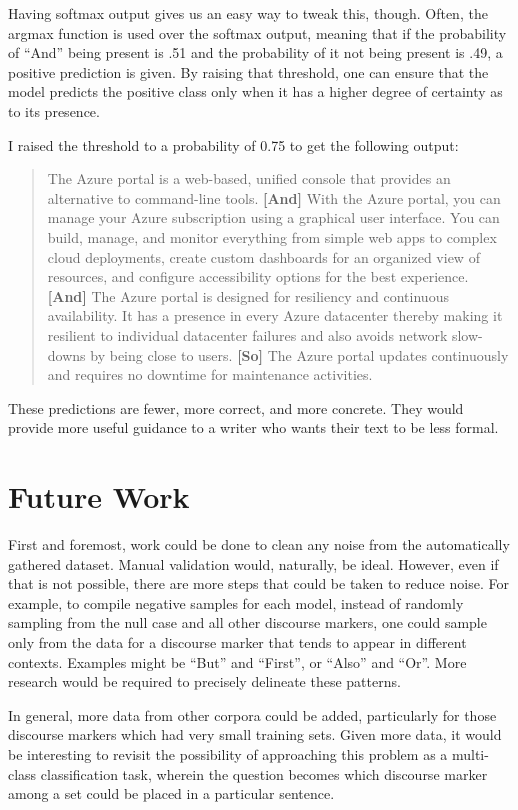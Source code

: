 Having softmax output gives us an easy way to tweak this, though. Often, the argmax function is used over the softmax output, meaning that if the probability of ``And'' being present is .51 and the probability of it not being present is .49, a positive prediction is given. By raising that threshold, one can ensure that the model predicts the positive class only when it has a higher degree of certainty as to its presence.

I raised the threshold to a probability of 0.75 to get the following output:

\begin{quote}
The Azure portal is a web-based, unified console that provides an alternative to command-line tools. \textbf{[And]} With the Azure portal, you can manage your Azure subscription using a graphical user interface. You can build, manage, and monitor everything from simple web apps to complex cloud deployments, create custom dashboards for an organized view of resources, and configure accessibility options for the best experience. \textbf{[And]} The Azure portal is designed for resiliency and continuous availability. It has a presence in every Azure datacenter thereby making it resilient to individual datacenter failures and also avoids network slow-downs by being close to users. \textbf{[So]} The Azure portal updates continuously and requires no downtime for maintenance activities.
\end{quote}

These predictions are fewer, more correct, and more concrete. They would provide more useful guidance to a writer who wants their text to be less formal.

\section{Future Work}

First and foremost, work could be done to clean any noise from the automatically gathered dataset. Manual validation would, naturally, be ideal. However, even if that is not possible, there are more steps that could be taken to reduce noise. For example, to compile negative samples for each model, instead of randomly sampling from the null case and all other discourse markers, one could sample only from the data for a discourse marker that tends to appear in different contexts. Examples might be ``But'' and ``First'', or ``Also'' and ``Or''. More research would be required to precisely delineate these patterns.

In general, more data from other corpora could be added, particularly for those discourse markers which had very small training sets. Given more data, it would be interesting to revisit the possibility of approaching this problem as a multi-class classification task, wherein the question becomes which discourse marker among a set could be placed in a particular sentence.

